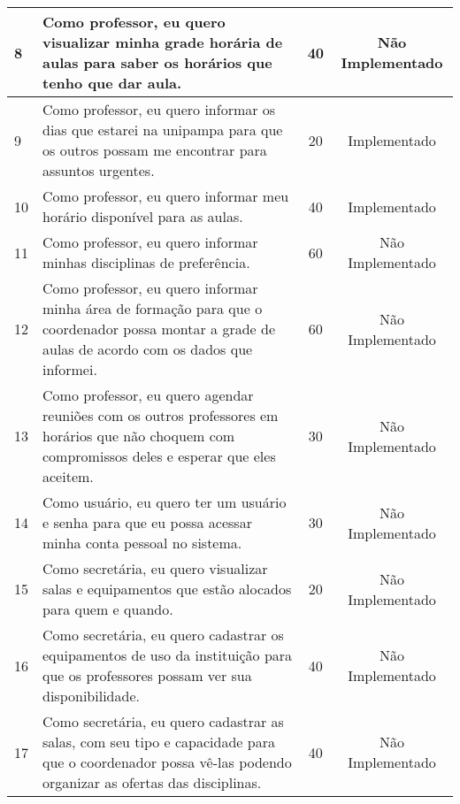 \begin{landscape}
\begin{longtable}{|p{0.5in}|p{6in}|c|c|}
		\hline \rowcolor{cNaoImplementado}
		         8 & Como professor, eu quero visualizar minha grade horária de aulas para saber os horários que tenho que dar aula. &         40 & Não Implementado \\
		
		\hline \rowcolor{cImplementado}
		         9 & Como professor, eu quero informar os dias que estarei na unipampa para que os outros possam me encontrar para assuntos urgentes.  &         20 & Implementado \\
		
		\hline	\rowcolor{cImplementado}
		        10 & Como professor, eu quero informar meu horário disponível para as aulas. &         40 & Implementado \\
		
		\hline	\rowcolor{cUserSprint}
				11 & Como professor, eu quero informar minhas disciplinas de preferência. & 			60 & Não Implementado \\	
		
		\hline	\rowcolor{cNaoImplementado}
				12 & Como professor, eu quero informar minha área de formação para que o coordenador possa montar a grade de aulas de acordo com os dados que informei. & 60 & Não Implementado \\
		
		\hline	\rowcolor{cNaoImplementado}
		        13 & Como professor, eu quero agendar reuniões com os outros professores em horários que não choquem com compromissos deles e esperar que eles aceitem.  &         30 & Não Implementado \\
		
		\hline \rowcolor{cUserSprint}
		        14 & Como usuário, eu quero ter um usuário e senha para que eu possa acessar minha conta pessoal no sistema. &         30 & Não Implementado \\
		
		\hline \rowcolor{cNaoImplementado}
		        15 & Como secretária, eu quero visualizar salas e equipamentos que estão alocados para quem e quando.  &         20 & Não Implementado \\
		
		\hline \rowcolor{cNaoImplementado}
		        16 & Como secretária, eu quero cadastrar os equipamentos de uso da instituição para que os professores possam ver sua disponibilidade.  &         40 & Não Implementado \\
		
		\hline \rowcolor{cNaoImplementado}
		        17 & Como secretária, eu quero cadastrar as salas, com seu tipo e capacidade para que o coordenador possa vê-las podendo organizar as ofertas das disciplinas. &         40 & Não Implementado \\
		

\end{longtable}
\end{landscape}
